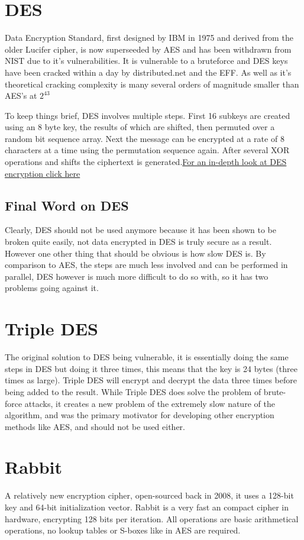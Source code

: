 \documentclass[a4paper, 11pt]{article}
\begin{document}
\section*{DES}
Data Encryption Standard, first designed by IBM in 1975 and derived from the older Lucifer cipher, is now superseeded by AES and has been withdrawn from NIST due to it's vulnerabilities.  It is vulnerable to a bruteforce and DES keys have been cracked within a day by distributed.net and the EFF.  As well as it's theoretical cracking complexity is many several orders of magnitude smaller than AES's at $2^{43}$

To keep things brief, DES involves multiple steps.  First 16 subkeys are created using an 8 byte key, the results of which are shifted, then permuted over a random bit sequence array.  Next the message can be encrypted at a rate of 8 characters at a time using the permutation sequence again.  After several XOR operations and shifts the ciphertext is generated.\href{http://www.tero.co.uk/des/explain.php#Triple}{For an in-depth look at DES encryption click here}

\subsection*{Final Word on DES}
Clearly, DES should not be used anymore because it has been shown to be broken quite easily, not data encrypted in DES is truly secure as a result.  However one other thing that should be obvious is how slow DES is.  By comparison to AES, the steps are much less involved and can be performed in parallel, DES however is much more difficult to do so with, so it has two problems going against it.

\section*{Triple DES}
The original solution to DES being vulnerable, it is essentially doing the same steps in DES but doing it three times, this means that the key is 24 bytes (three times as large).  Triple DES will encrypt and decrypt the data three times before being added to the result.  While Triple DES does solve the problem of brute-force attacks, it creates a new problem of the extremely slow nature of the algorithm, and was the primary motivator for developing other encryption methods like AES, and should not be used either.

\section*{Rabbit}
A relatively new encryption cipher, open-sourced back in 2008, it uses a 128-bit key and 64-bit initialization vector.  Rabbit is a very fast an compact cipher in hardware, encrypting 128 bits per iteration.  All operations are basic arithmetical operations, no lookup tables or S-boxes like in AES are required.\\
\end{document}
